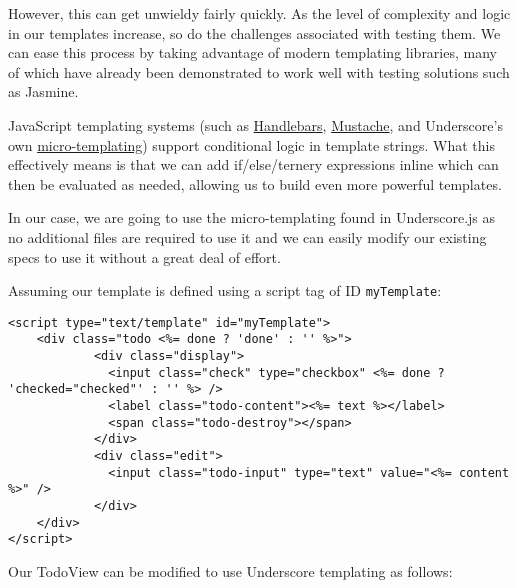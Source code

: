 \documentclass[9pt]{book}
\begin{document}
However, this can get unwieldy fairly quickly. As the level of
complexity and logic in our templates increase, so do the challenges
associated with testing them. We can ease this process by taking
advantage of modern templating libraries, many of which have already
been demonstrated to work well with testing solutions such as Jasmine.

JavaScript templating systems (such as
\href{http://handlebarsjs.com/}{Handlebars},
\href{http://mustache.github.com/}{Mustache}, and Underscore's own
\href{http://underscorejs.org/\#template}{micro-templating}) support
conditional logic in template strings. What this effectively means is
that we can add if/else/ternery expressions inline which can then be
evaluated as needed, allowing us to build even more powerful templates.

In our case, we are going to use the micro-templating found in
Underscore.js as no additional files are required to use it and we can
easily modify our existing specs to use it without a great deal of
effort.

Assuming our template is defined using a script tag of ID
\texttt{myTemplate}:

\begin{verbatim}
<script type="text/template" id="myTemplate">
    <div class="todo <%= done ? 'done' : '' %>">
            <div class="display">
              <input class="check" type="checkbox" <%= done ? 'checked="checked"' : '' %> />
              <label class="todo-content"><%= text %></label>
              <span class="todo-destroy"></span>
            </div>
            <div class="edit">
              <input class="todo-input" type="text" value="<%= content %>" />
            </div>
    </div>
</script>
\end{verbatim}

Our TodoView can be modified to use Underscore templating as follows:
\end{document}
